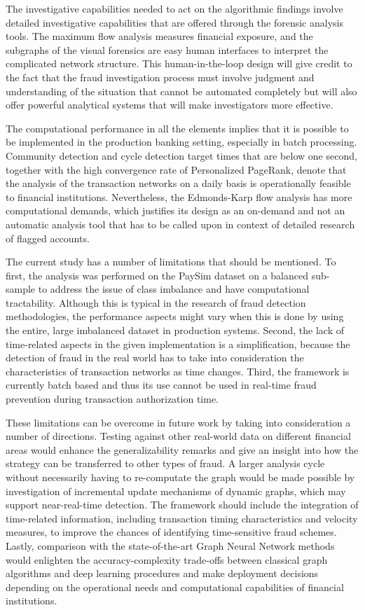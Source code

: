 \documentclass[lettersize,journal]{IEEEtran}
\begin{document}
The investigative capabilities needed to act on the algorithmic findings involve detailed investigative capabilities that are offered through the forensic analysis tools. The maximum flow analysis measures financial exposure, and the subgraphs of the visual forensics are easy human interfaces to interpret the complicated network structure. This human-in-the-loop design will give credit to the fact that the fraud investigation process must involve judgment and understanding of the situation that cannot be automated completely but will also offer powerful analytical systems that will make investigators more effective.

The computational performance in all the elements implies that it is possible to be implemented in the production banking setting, especially in batch processing. Community detection and cycle detection target times that are below one second, together with the high convergence rate of Personalized PageRank, denote that the analysis of the transaction networks on a daily basis is operationally feasible to financial institutions. Nevertheless, the Edmonds-Karp flow analysis has more computational demands, which justifies its design as an on-demand and not an automatic analysis tool that has to be called upon in context of detailed research of flagged accounts.

The current study has a number of limitations that should be mentioned. To first, the analysis was performed on the PaySim dataset on a balanced sub-sample to address the issue of class imbalance and have computational tractability. Although this is typical in the research of fraud detection methodologies, the performance aspects might vary when this is done by using the entire, large imbalanced dataset in production systems. Second, the lack of time-related aspects in the given implementation is a simplification, because the detection of fraud in the real world has to take into consideration the characteristics of transaction networks as time changes. Third, the framework is currently batch based and thus its use cannot be used in real-time fraud prevention during transaction authorization time.

These limitations can be overcome in future work by taking into consideration a number of directions. Testing against other real-world data on different financial areas would enhance the generalizability remarks and give an insight into how the strategy can be transferred to other types of fraud. A larger analysis cycle without necessarily having to re-computate the graph would be made possible by investigation of incremental update mechanisms of dynamic graphs, which may support near-real-time detection. The framework should include the integration of time-related information, including transaction timing characteristics and velocity measures, to improve the chances of identifying time-sensitive fraud schemes. Lastly, comparison with the state-of-the-art Graph Neural Network methods would enlighten the accuracy-complexity trade-offs between classical graph algorithms and deep learning procedures and make deployment decisions depending on the operational needs and computational capabilities of financial institutions.
\end{document}
